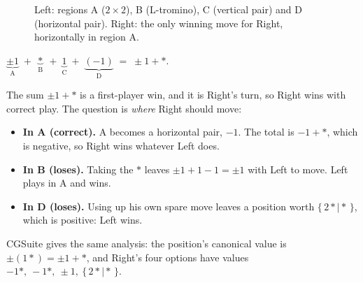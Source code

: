 \documentclass[11pt,a4paper]{article}
\newcommand{\grid}[2]{\draw[gridc, line width=0.5pt] (0,0) grid (#2,-#1);}
\newcommand{\vd}[2]{\fill[leftc, rounded corners=1.5pt]
  ({#2-1+0.13},{-#1-1+0.13}) rectangle ({#2-0.13},{-#1+1-0.13});}
\newcommand{\hd}[2]{\fill[rightc, rounded corners=1.5pt]
  ({#2-1+0.13},{-#1+0.13}) rectangle ({#2+1-0.13},{-#1+1-0.13});}
\newcommand{\lab}[3]{\node[font=\sffamily\bfseries\small, text=black!65] at ({#2-0.5},{-#1+0.5}) {#3};}
\newcommand{\dm}{\mathbin{\vert}}  %
\newcommand{\game}[2]{\{\,#1 \dm #2\,\}}
\begin{document}
\begin{figure}[H]
\centering
{}
\caption{Left: regions A ($2\times2$), B (L-tromino), C (vertical pair) and D (horizontal pair).
Right: the only winning move for Right, horizontally in region A.}
\end{figure}

\begin{center}
$\underbrace{\pm1}_{\text{A}} \;+\; \underbrace{*}_{\text{B}} \;+\; \underbrace{1}_{\text{C}}
\;+\; \underbrace{(-1)}_{\text{D}} \;=\; \pm1 + *$.
\end{center}

\noindent The sum $\pm1+*$ is a first-player win, and it is Right's turn, so Right wins with
correct play.  The question is \emph{where} Right should move:

\begin{itemize}
  \item \textbf{In A (correct).}  A becomes a horizontal pair, $-1$.  The total is $-1+*$,
        which is negative, so Right wins whatever Left does.
  \item \textbf{In B (loses).}  Taking the $*$ leaves $\pm1+1-1=\pm1$ with Left to move.  Left
        plays in A and wins.
  \item \textbf{In D (loses).}  Using up his own spare move leaves a position worth
        $\game{2*}{*}$, which is positive: Left wins.
\end{itemize}

CGSuite gives the same analysis: the position's canonical value is $\pm(1*)=\pm1+*$, and
Right's four options have values $-1*,\ -1*,\ \pm1,\ \game{2*}{*}$.
\end{document}
